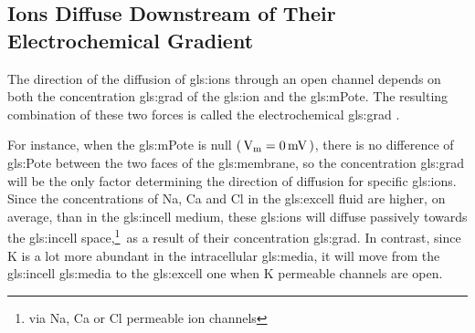\documentclass[class={myRUCProject}, crop=false]{standalone}
\begin{document}

\vspace{1em}




\subsection{Ions Diffuse Downstream of Their Electrochemical Gradient}


The direction of the diffusion of \glspl{gls:ion} through an open channel depends on both the concentration \gls{gls:grad} of the \gls{gls:ion} and the \gls{gls:mPote}. The resulting combination of these two forces is called the electrochemical \gls{gls:grad} \cite{Hammond2015ch3}.



For instance, when the \gls{gls:mPote} is null \(\br{\unit{\V\membrane}=\qty{0}{\mV}}\), there is no difference of \gls{gls:Pote} between the two faces of the \gls{gls:membrane}, so the concentration \gls{gls:grad} will be the only factor determining the direction of diffusion for specific \glspl{gls:ion}. 
Since the concentrations of \gls{Na}, \gls{Ca} and \gls{Cl} in the \gls{gls:excell} fluid are higher, on average, than in the \gls{gls:incell} medium, these \glspl{gls:ion} will diffuse passively towards the \gls{gls:incell} space,\footnote{via \gls{Na}, \gls{Ca} or \gls{Cl} permeable ion channels}~as a result of their concentration \gls{gls:grad}. 
In contrast, since \gls{K} is a lot more abundant in the intracellular \gls{gls:media}, it will move from the \gls{gls:incell} \gls{gls:media} to the \gls{gls:excell} one when \gls{K} permeable channels are open\cite{Hammond2015ch3}. 
\end{document}
